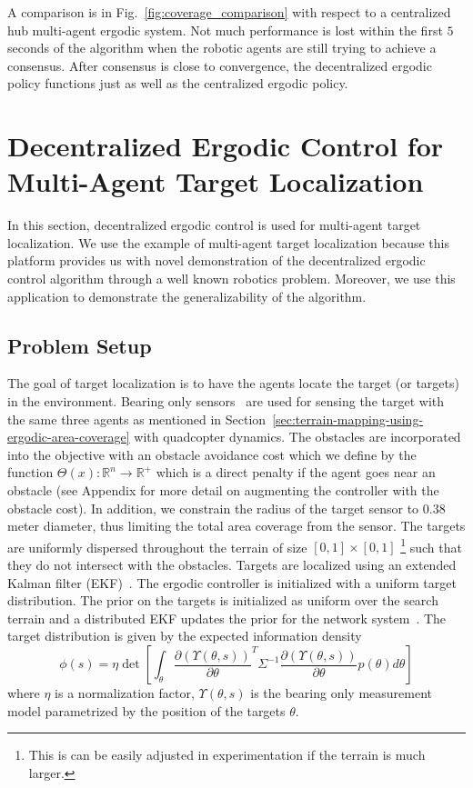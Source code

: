 \documentclass[letterpaper, 10 pt, conference]{ieeeconf}  %
\begin{document}
A comparison is in Fig.~\ref{fig:coverage_comparison} with respect to a centralized hub multi-agent ergodic system.
Not much performance is lost  within the first $5$ seconds of the algorithm when the robotic agents are still trying to achieve a consensus.
After consensus is close to convergence, the decentralized ergodic policy functions just as well as the centralized ergodic policy.
  
\section{Decentralized Ergodic Control for Multi-Agent Target Localization}
\label{sec:ergodic-control-for-multi-agent-pursuit-evasion-games}
In this section, decentralized ergodic control is used for multi-agent target localization.
We use the example of multi-agent target localization because this platform provides us with novel demonstration of the decentralized ergodic control algorithm through a well known robotics problem.
Moreover, we use this application to demonstrate the generalizability of the algorithm.

\subsection{Problem Setup}
The goal of target localization is to have the agents locate the target (or targets) in the environment. 
Bearing only sensors~\cite{mavrommatiTRO2017realTime, deans2001experimental} are used for sensing the target with the same three agents as mentioned in Section~\ref{sec:terrain-mapping-using-ergodic-area-coverage} with quadcopter dynamics.
The obstacles are incorporated into the objective with an obstacle avoidance cost which we define by the function $\Theta(x) : \mathbb{R}^n \to \mathbb{R}^+$ which is a direct penalty if the agent goes near an obstacle (see Appendix for more detail on augmenting the controller with the obstacle cost).
In addition, we constrain the radius of the target sensor to $0.38$ meter diameter, thus limiting the total area coverage from the sensor.
The targets are uniformly dispersed throughout the terrain of size $[0,1] \times[0,1]$ \footnote{This is can be easily adjusted in experimentation if the terrain is much larger.} such that they do not intersect with the obstacles.
Targets are localized using an extended Kalman filter (EKF)~\cite{kalman1960new, julier1997new}. 
The ergodic controller is initialized with a uniform target distribution. 
The prior on the targets is initialized as uniform over the search terrain and a distributed EKF updates the prior for the network system~\cite{carli2008distributed}.
The target distribution is given by the expected information density~\cite{miller2016ergodic, mavrommatiTRO2017realTime} 
\begin{equation} \label{eq:eid}
\phi(s) = \eta \det \left[ \int_\theta  \frac{\partial \left( \Upsilon(\theta, s) \right) }{\partial \theta}^T \Sigma^{-1} \frac{\partial \left( \Upsilon(\theta, s) \right)}{\partial \theta} p(\theta) d\theta \right]
\end{equation}
where $\eta$ is a normalization factor, $\Upsilon(\theta, s)$ is the bearing only measurement model parametrized by the position of the targets $\theta$.
\end{document}
